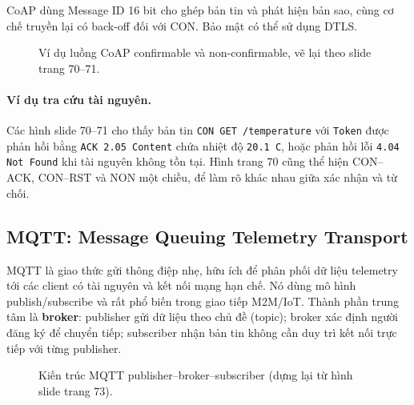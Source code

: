 CoAP dùng Message ID 16 bit cho ghép bản tin và phát hiện bản sao, cùng cơ chế truyền lại có back-off đối với CON. Bảo mật có thể sử dụng DTLS. 

\begin{figure}[htbp]\centering
{}
\caption{Ví dụ luồng CoAP confirmable và non-confirmable, vẽ lại theo slide trang 70--71.}\end{figure}

\paragraph{Ví dụ tra cứu tài nguyên.} Các hình slide 70--71 cho thấy bản tin \texttt{CON GET /temperature} với \texttt{Token} được phản hồi bằng \texttt{ACK 2.05 Content} chứa nhiệt độ \texttt{20.1 C}, hoặc phản hồi lỗi \texttt{4.04 Not Found} khi tài nguyên không tồn tại. Hình trang 70 cũng thể hiện CON--ACK, CON--RST và NON một chiều, để làm rõ khác nhau giữa xác nhận và từ chối. 

\subsection{MQTT: Message Queuing Telemetry Transport}
MQTT là giao thức gửi thông điệp nhẹ, hữu ích để phân phối dữ liệu telemetry tới các client có tài nguyên và kết nối mạng hạn chế. Nó dùng mô hình publish/subscribe và rất phổ biến trong giao tiếp M2M/IoT. Thành phần trung tâm là \textbf{broker}: publisher gửi dữ liệu theo chủ đề (topic); broker xác định người đăng ký để chuyển tiếp; subscriber nhận bản tin không cần duy trì kết nối trực tiếp với từng publisher. 

\begin{figure}[htbp]\centering
{}
\caption{Kiến trúc MQTT publisher--broker--subscriber (dựng lại từ hình slide trang 73).}\end{figure}

